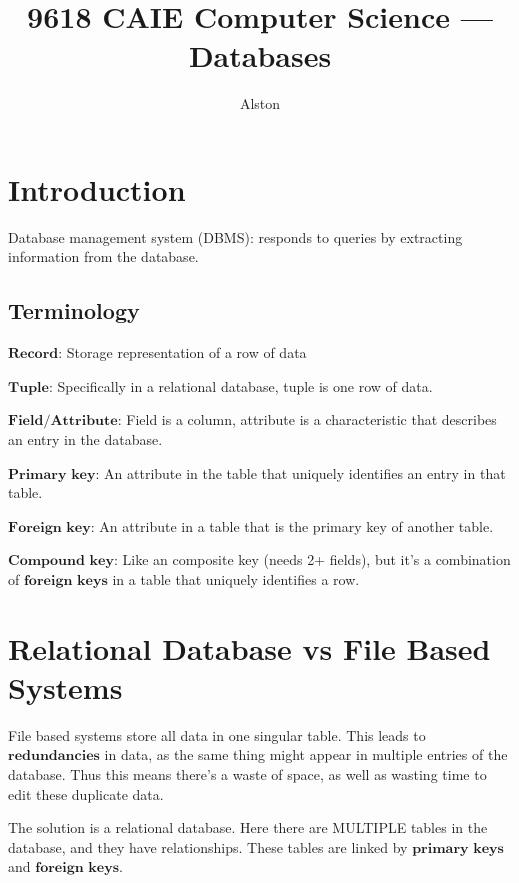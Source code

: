 \documentclass{article}
\title{9618 CAIE Computer Science — Databases}
\author{Alston}
\date{}
\theoremstyle{mytheoremstyle}
\theoremstyle{mytheoremstyle}
\theoremstyle{myproblemstyle}
\begin{document}
    \maketitle

    \section{Introduction}
    Database management system (DBMS): responds to queries by extracting information from the database.

    \subsection{Terminology}
    
    $\textbf{Record:}$ Storage representation of a row of data

    $\textbf{Tuple:}$ Specifically in a relational database, tuple is one row of data.

    $\textbf{Field/Attribute:}$ Field is a column, attribute is a characteristic that describes an entry in the database.

    $\textbf{Primary key:}$ An attribute in the table that uniquely identifies an entry in that table.

    $\textbf{Foreign key:}$ An attribute in a table that is the primary key of another table.
    
    $\textbf{Compound key:}$ Like an composite key (needs 2+ fields), but it's a combination of $\textbf{foreign keys}$ in a table that uniquely identifies a row.

    \section{Relational Database vs File Based Systems}

    File based systems store all data in one singular table. This leads to $\textbf{redundancies}$ in data, as the same thing might appear in multiple entries of the database. Thus this means there's a waste of space, as well as wasting time to edit these duplicate data.

    The solution is a relational database. Here there are MULTIPLE tables in the database, and they have relationships. These tables are linked by $\textbf{primary keys}$ and $\textbf{foreign keys}$.

    
    
\end{document}
